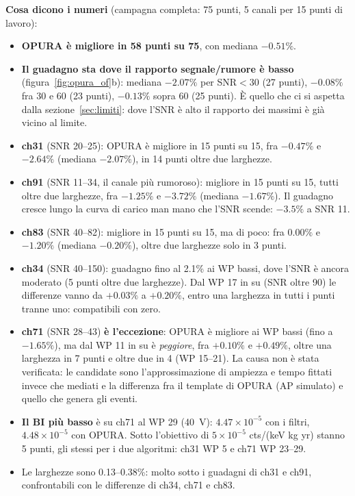 \documentclass[11pt,a4paper]{article}
\begin{document}
\textbf{Cosa dicono i numeri} (campagna completa: 75 punti, 5 canali per 15 punti di lavoro):
\begin{itemize}
  \item \textbf{OPURA è migliore in 58 punti su 75}, con mediana $-0.51\%$.
  \item \textbf{Il guadagno sta dove il rapporto segnale/rumore è basso}
    (figura~\ref{fig:opura_of}b): mediana $-2.07\%$ per SNR$<30$ (27 punti), $-0.08\%$ fra 30 e 60
    (23 punti), $-0.13\%$ sopra 60 (25 punti). È quello che ci si aspetta dalla
    sezione~\ref{sec:limiti}: dove l'SNR è alto il rapporto dei massimi è già vicino al limite.
  \item \textbf{ch31} (SNR 20--25): OPURA è migliore in 15 punti su 15, fra $-0.47\%$ e $-2.64\%$
    (mediana $-2.07\%$), in 14 punti oltre due larghezze.
  \item \textbf{ch91} (SNR 11--34, il canale più rumoroso): migliore in 15 punti su 15, tutti oltre
    due larghezze, fra $-1.25\%$ e $-3.72\%$ (mediana $-1.67\%$). Il guadagno cresce lungo la curva
    di carico man mano che l'SNR scende: $-3.5\%$ a SNR 11.
  \item \textbf{ch83} (SNR 40--82): migliore in 15 punti su 15, ma di poco: fra $0.00\%$ e
    $-1.20\%$ (mediana $-0.20\%$), oltre due larghezze solo in 3 punti.
  \item \textbf{ch34} (SNR 40--150): guadagno fino al 2.1\% ai WP bassi, dove l'SNR è ancora
    moderato (5 punti oltre due larghezze). Dal WP 17 in su (SNR oltre 90) le differenze vanno da
    $+0.03\%$ a $+0.20\%$, entro una larghezza in tutti i punti tranne uno: compatibili con zero.
  \item \textbf{ch71} (SNR 28--43) \textbf{è l'eccezione}: OPURA è migliore ai WP bassi (fino a
    $-1.65\%$), ma dal WP 11 in su è \emph{peggiore}, fra $+0.10\%$ e $+0.49\%$, oltre una larghezza
    in 7 punti e oltre due in 4 (WP 15--21). La causa non è stata verificata: le candidate sono
    l'approssimazione di ampiezza e tempo fittati invece che mediati e la differenza fra il
    template di OPURA (AP simulato) e quello che genera gli eventi.
  \item \textbf{Il BI più basso} è su ch71 al WP 29 (40~V): $4.47\times10^{-5}$ con i filtri,
    $4.48\times10^{-5}$ con OPURA. Sotto l'obiettivo di $5\times10^{-5}$ cts/(keV kg yr) stanno 5
    punti, gli stessi per i due algoritmi: ch31 WP 5 e ch71 WP 23--29.
  \item Le larghezze sono 0.13--0.38\%: molto sotto i guadagni di ch31 e ch91, confrontabili con
    le differenze di ch34, ch71 e ch83.
\end{itemize}
\end{document}
